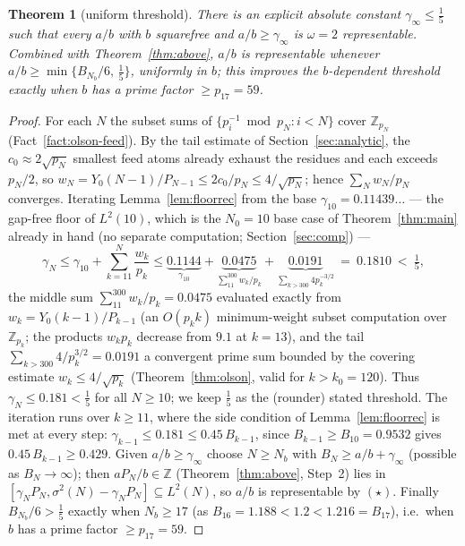 \documentclass[11pt]{amsart}
\theoremstyle{plain}
\newtheorem{theorem}{Theorem}[section]
\theoremstyle{definition}
\newcommand{\Z}{\mathbb{Z}}
\begin{document}
\begin{theorem}[uniform threshold]\label{thm:uniform}\label{thm:Aprime}
There is an explicit absolute constant $\gamma_\infty\le \tfrac15$ such that every
$a/b$ with $b$ squarefree and $a/b\ge\gamma_\infty$ is $\omega=2$ representable.
Combined with Theorem~\ref{thm:above}, $a/b$ is representable whenever
$a/b\ge\min\{B_{N_b}/6,\,\tfrac15\}$, uniformly in $b$; this improves the
$b$-dependent threshold exactly when $b$ has a prime factor $\ge p_{17}=59$.
\end{theorem}

\begin{proof}
For each $N$ the subset sums of $\{p_i^{-1}\bmod p_N:i<N\}$ cover $\Z_{p_N}$
(Fact~\ref{fact:olson-feed}).  By the tail estimate of Section~\ref{sec:analytic},
the $c_0\approx2\sqrt{p_N}$ smallest feed atoms already exhaust the residues and
each exceeds $p_N/2$, so
$w_N=Y_0(N-1)/P_{N-1}\le 2c_0/p_N\le 4/\sqrt{p_N}$; hence $\sum_N w_N/p_N$
converges.  Iterating Lemma~\ref{lem:floorrec} from the base
$\gamma_{10}=0.11439\ldots$ --- the gap-free floor of $L^2(10)$, which is the
$N_0=10$ base case of Theorem~\ref{thm:main} already in hand (no separate
computation; Section~\ref{sec:comp}) ---
\[
  \gamma_N\le\gamma_{10}+\sum_{k=11}^{N}\frac{w_k}{p_k}
  \le\underbrace{0.1144}_{\gamma_{10}}
  +\underbrace{0.0475}_{\sum_{11}^{300}w_k/p_k}
  +\underbrace{0.0191}_{\sum_{k>300}4p_k^{-3/2}}\ =\ 0.1810\ <\ \tfrac15 ,
\]
the middle sum $\sum_{11}^{300}w_k/p_k=0.0475$ evaluated exactly from
$w_k=Y_0(k-1)/P_{k-1}$ (an $O(p_k k)$ minimum-weight subset computation over
$\Z_{p_k}$; the products $w_kp_k$ decrease from $9.1$ at $k=13$), and the tail
$\sum_{k>300}4/p_k^{3/2}=0.0191$ a convergent prime sum bounded by the covering
estimate $w_k\le4/\sqrt{p_k}$ (Theorem~\ref{thm:olson}, valid for $k>k_0=120$).
Thus $\gamma_N\le0.181<\tfrac15$ for all $N\ge 10$; we keep $\tfrac15$ as the
(rounder) stated threshold.  The
iteration runs over $k\ge11$, where the side condition of
Lemma~\ref{lem:floorrec} is met at every step: $\gamma_{k-1}\le0.181\le
0.45\,B_{k-1}$, since $B_{k-1}\ge B_{10}=0.9532$ gives $0.45\,B_{k-1}\ge0.429$.
Given $a/b\ge\gamma_\infty$ choose $N\ge N_b$ with $B_N\ge a/b+\gamma_\infty$
(possible as $B_N\to\infty$); then $aP_N/b\in\Z$ (Theorem~\ref{thm:above}, Step~2)
lies in $[\gamma_NP_N,\sigma^2(N)-\gamma_NP_N]\subseteq L^2(N)$, so $a/b$ is
representable by $(\star)$.  Finally $B_{N_b}/6>\tfrac15$ exactly when $N_b\ge 17$
(as $B_{16}=1.188<1.2<1.216=B_{17}$), i.e.\ when $b$ has a prime factor
$\ge p_{17}=59$.
\end{proof}
\end{document}
